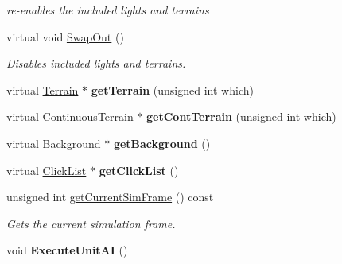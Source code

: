 \begin{DoxyCompactItemize}
\begin{DoxyCompactList}\small\item\em re-\/enables the included lights and terrains \end{DoxyCompactList}\item 
virtual void \hyperlink{classStarSystem_a9126bfe990d94fb19687a6e1412847dc}{Swap\+Out} ()\hypertarget{classStarSystem_a9126bfe990d94fb19687a6e1412847dc}{}\label{classStarSystem_a9126bfe990d94fb19687a6e1412847dc}

\begin{DoxyCompactList}\small\item\em Disables included lights and terrains. \end{DoxyCompactList}\item 
virtual \hyperlink{classTerrain}{Terrain} $\ast$ {\bfseries get\+Terrain} (unsigned int which)\hypertarget{classStarSystem_ad78b4513097646e46f29a81db3bd58f3}{}\label{classStarSystem_ad78b4513097646e46f29a81db3bd58f3}

\item 
virtual \hyperlink{classContinuousTerrain}{Continuous\+Terrain} $\ast$ {\bfseries get\+Cont\+Terrain} (unsigned int which)\hypertarget{classStarSystem_a1c5bd267ab4847d07fd396d133ae2c43}{}\label{classStarSystem_a1c5bd267ab4847d07fd396d133ae2c43}

\item 
virtual \hyperlink{classBackground}{Background} $\ast$ {\bfseries get\+Background} ()\hypertarget{classStarSystem_a267efed120650d298c4c01bace7172a5}{}\label{classStarSystem_a267efed120650d298c4c01bace7172a5}

\item 
virtual \hyperlink{classClickList}{Click\+List} $\ast$ {\bfseries get\+Click\+List} ()\hypertarget{classStarSystem_a2aaa227d4a16c3b34540fcda97c67c00}{}\label{classStarSystem_a2aaa227d4a16c3b34540fcda97c67c00}

\item 
unsigned int \hyperlink{classStarSystem_a9400f0ededdd5d0450ec27dc27401659}{get\+Current\+Sim\+Frame} () const \hypertarget{classStarSystem_a9400f0ededdd5d0450ec27dc27401659}{}\label{classStarSystem_a9400f0ededdd5d0450ec27dc27401659}

\begin{DoxyCompactList}\small\item\em Gets the current simulation frame. \end{DoxyCompactList}\item 
void {\bfseries Execute\+Unit\+AI} ()\hypertarget{classStarSystem_abc3aca2045beba9ed1046486931ba188}{}\label{classStarSystem_abc3aca2045beba9ed1046486931ba188}


\end{DoxyCompactItemize}

